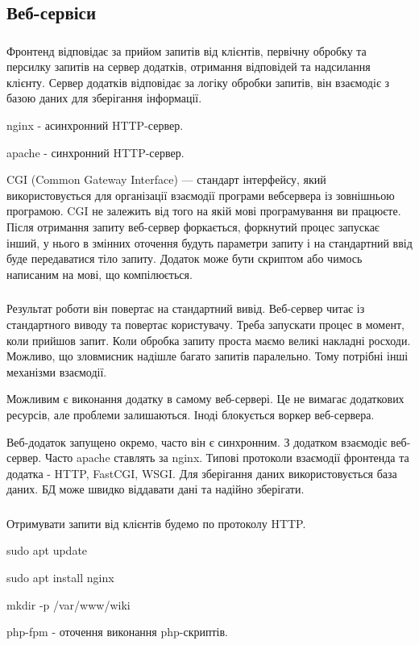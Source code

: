 \documentclass[t]{beamer}  %
\begin{document}
\subsection{Веб-сервіси}

\begin{frame}
 	\frametitle{\insertsection} 
 	\framesubtitle{\insertsubsection} 	
Фронтенд відповідає за прийом запитів від клієнтів, первічну обробку та персилку запитів на сервер додатків, отримання відповідей та надсилання клієнту. Сервер додатків відповідає за логіку обробки запитів, він взаємодіє з базою даних для зберігання інформації.

nginx - асинхронний HTTP-сервер.

apache - синхронний HTTP-сервер.

CGI (Common Gateway Interface) — стандарт інтерфейсу, який використовується для організації взаємодії програми вебсервера із зовнішньою програмою. CGI не залежить від того на якій мові програмування ви працюєте. Після отримання запиту веб-сервер форкається, форкнутий процес запускає інший, у нього в змінних оточення будуть параметри запиту і на стандартний ввід буде передаватися тіло запиту. Додаток може бути скриптом або чимось написаним на мові, що компілюється. 

\end{frame}

\begin{frame}
 	\frametitle{\insertsection} 
 	\framesubtitle{\insertsubsection} 	
Результат роботи він повертає на стандартний вивід. Веб-сервер читає із стандартного виводу та повертає користувачу. Треба запускати процес в момент, коли прийшов запит. Коли обробка запиту проста маємо великі накладні росходи. Можливо, що зловмисник надішле багато запитів паралельно. Тому потрібні інші механізми взаємодії.

Можливим є виконання додатку в самому веб-сервері. Це не вимагає додаткових ресурсів, але проблеми залишаються. Іноді блокується воркер веб-сервера.

Веб-додаток запущено окремо, часто він є синхронним. З додатком взаємодіє веб-сервер. Часто apache ставлять за nginx. Типові протоколи взаємодії фронтенда та додатка - HTTP, FastCGI, WSGI. Для зберігання даних використовується база даних. БД може швидко віддавати дані та надійно зберігати.
\end{frame}

\begin{frame}
 	\frametitle{\insertsection} 
 	\framesubtitle{\insertsubsection}
Отримувати запити від клієнтів будемо по протоколу  HTTP.

sudo apt update

sudo apt install nginx

mkdir -p /var/www/wiki

php-fpm - оточення виконання php-скриптів.

\end{frame}
\end{document}
